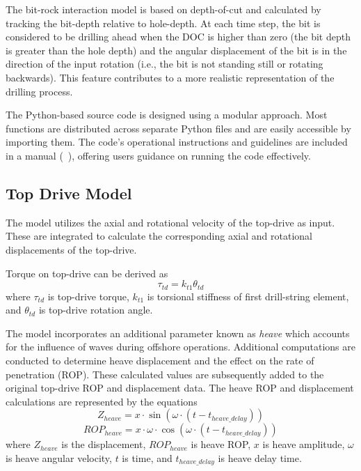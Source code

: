 The bit-rock interaction model is based on depth-of-cut and calculated by tracking the bit-depth relative to hole-depth. At each time step, the bit is considered to be drilling ahead when the DOC is higher than zero (the bit depth is greater than the hole depth) and the angular displacement of the bit is in the direction of the input rotation (i.e., the bit is not standing still or rotating backwards).  This feature contributes to a more realistic representation of the drilling process.

The Python-based source code is designed using a modular approach.  Most functions are distributed across separate Python files and are easily accessible by importing them. The code's operational instructions and guidelines are included in a manual (~\cite{ref:dixit2021a}), offering users guidance on running the code effectively.

\subsection{Top Drive Model}
The model utilizes the axial and rotational velocity of the top-drive as input. These are integrated to calculate the corresponding axial and rotational displacements of the top-drive.

Torque on top-drive can be derived as
\begin{equation}\label{TorqueEQ}
  \tau_{td} = k_{t1} \theta_{td}
\end{equation}
where $\tau_{td}$ is top-drive torque, $k_{t1}$ is torsional stiffness of first drill-string element, and $\theta_{td}$ is top-drive rotation angle. 

The model incorporates an additional parameter known as \emph{heave} which accounts for the influence of waves during offshore operations. Additional computations are conducted to determine heave displacement and the effect on the rate of penetration (ROP). These calculated values are subsequently added to the original top-drive ROP and displacement data. The heave ROP and displacement calculations are represented by the equations
\begin{equation}\label{Z_heave}
  Z_{heave} = x \cdot \sin(\omega \cdot (t - t_{heave\_delay}))
\end{equation}
\begin{equation}\label{ROP_heave}
  ROP_{heave} = x \cdot \omega \cdot \cos(\omega \cdot (t - t_{heave\_delay}))
\end{equation}
where $Z_{heave}$ is the displacement, $ROP_{heave}$ is heave ROP, $x$ is heave amplitude, $\omega$ is heave angular velocity, $t$ is time, and $t_{heave\_delay}$ is heave delay time.

